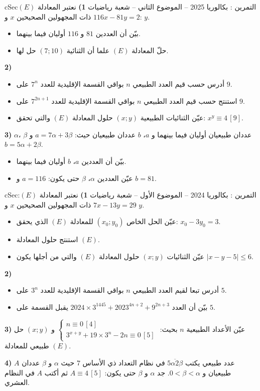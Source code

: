 \documentclass[12pt,a4paper]{article}
\newenvironment{BOX}[2]{\begin{otherlanguage}{english}\begin{arbox}{#1}{#2}}{\end{arbox}\end{otherlanguage}}
\newcounter{exo}
\newenvironment{tamrin}[1]{\stepcounter{exo}\begin{BOX}{cSec}{التمرين \theexo: #1}}{\end{BOX}}
\newenvironment{sq}{\begin{itemize}[leftmargin=2.4em,itemsep=3pt]}{\end{itemize}}
\newcommand{\qa}{\item[(أ)]}\newcommand{\qb}{\item[(ب)]}\newcommand{\qc}{\item[(جـ)]}\newcommand{\qd}{\item[(د)]}\newcommand{\qe}{\item[(هـ)]}
\begin{document}
\begin{tamrin}{بكالوريا 2025 -- الموضوع الثاني -- شعبة رياضيات}
\textbf{1)} نعتبر المعادلة $(E)$:\quad $116x-81y=2$ ذات المجهولين الصحيحين $x$ و $y$.
\begin{sq}
\qa بيّن أن العددين $81$ و $116$ أوليان فيما بينهما.
\qb حلّ المعادلة $(E)$ علما أن الثنائية $(7;10)$ حل لها.
\end{sq}
\textbf{2)}
\begin{sq}
\qa أدرس حسب قيم العدد الطبيعي $n$ بواقي القسمة الإقليدية للعدد $7^n$ على $9$.
\qb استنتج حسب قيم العدد الطبيعي $n$ بواقي القسمة الإقليدية للعدد $7^{2n+1}$ على $9$.
\qc عيّن الثنائيات الطبيعية $(x;y)$ حلول المعادلة $(E)$ والتي تحقق: $x^y\equiv4\,[9]$.
\end{sq}
\textbf{3)} $\alpha$، $\beta$ عددان طبيعيان أوليان فيما بينهما و $a$، $b$ عددان طبيعيان حيث: $a=7\alpha+3\beta$ و $b=5\alpha+2\beta$.
\begin{sq}
\qa بيّن أن العددين $a$، $b$ أوليان فيما بينهما.
\qb عيّن العددين $\alpha$، $\beta$ حتى يكون: $a=116$ و $b=81$.
\end{sq}
\end{tamrin}

\begin{tamrin}{بكالوريا 2024 -- الموضوع الأول -- شعبة رياضيات}
\textbf{1)} نعتبر المعادلة $(E)$:\quad $7x-13y=29$ ذات المجهولين الصحيحين $x$ و $y$.
\begin{sq}
\qa عيّن الحل الخاص $(x_0;y_0)$ للمعادلة $(E)$ الذي يحقق: $x_0-3y_0=3$.
\qb استنتج حلول المعادلة $(E)$.
\qc عيّن الثنائيات $(x;y)$ حلول المعادلة $(E)$ والتي من أجلها يكون $|x-y-5|\le6$.
\end{sq}
\textbf{2)}
\begin{sq}
\qa أدرس تبعا لقيم العدد الطبيعي $n$ بواقي القسمة الإقليدية للعدد $3^n$ على $5$.
\qb بيّن أن العدد $2024\times3^{1445}+2023^{4n+2}+9^{2n+3}$ يقبل القسمة على $5$.
\end{sq}
\textbf{3)} عيّن الأعداد الطبيعية $n$ بحيث:
$\begin{cases} n\equiv0\,[4]\\ 3^{x+y}+19\times3^n-2n\equiv0\,[5]\end{cases}$
و $(x;y)$ حل طبيعي للمعادلة $(E)$.

\textbf{4)} $A$ عدد طبيعي يكتب $\overline{5\alpha2\beta}$ في نظام التعداد ذي الأساس $7$ حيث $\alpha$ و $\beta$ عددان طبيعيان و $0<\beta<\alpha$.
جد $\alpha$ و $\beta$ حتى يكون: $A\equiv4\,[5]$ ثم أكتب $A$ في النظام العشري.
\end{tamrin}
\end{document}
